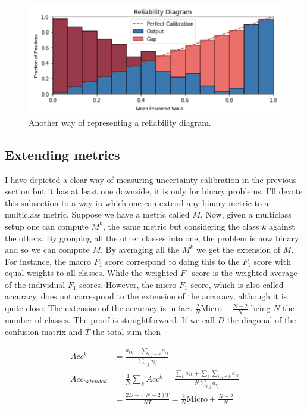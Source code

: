\begin{figure}[ht]
    \centering
    \includegraphics[width=\textwidth]{imgs/rel2.png}
    \caption{Another way of representing a reliability diagram.}
    \label{fig:rel2}
\end{figure}

\subsection{Extending metrics}

I have depicted a clear way of measuring uncertainty calibration in the previous section but it has at least one downside, it is only for binary problems. I'll devote this subsection to a way in which one can extend any binary metric to a multiclass metric. Suppose we have a metric called $M$.  Now, given a multiclass setup one can compute $M^k$, the same metric but considering the class $k$ against the others. By grouping all the other classes into one, the problem is now binary and so we can compute $M$. By averaging all the $M^k$ we get the extension of $M$. For instance, the macro $F_1$ score correspond to doing this to the $F_1$ score with equal weights to all classes. While the weighted $F_1$ score is the weighted average of the individual $F_1$ scores. However, the micro $F_1$ score, which is also called accuracy, does not correspond to the extension of the accuracy, although it is quite close. The extension of the accuracy is in fact $\frac{2}{N} \text{Micro} + \frac{N-2}{N}$ being $N$ the number of classes. The proof is straightforward. If we call $D$ the diagonal of the confusion matrix and $T$ the total sum then

\begin{align}
    Acc^k &= \frac{a_{kk} + \sum_{i,j \neq k} a_{ij}}{\sum_{i,j}a_{ij}} \\
    Acc_{extended} &= \frac{1}{N} \sum_{k} Acc^k = \frac{\sum_{k}a_{kk} + \sum_{k} \sum_{i,j\neq k} a_{ij}}{N \sum_{i,j}a_{ij}} \\
    &= \frac{2D + (N-2) T}{N T} = \frac{2}{N} \text{Micro} + \frac{N-2}{N}
\end{align}

